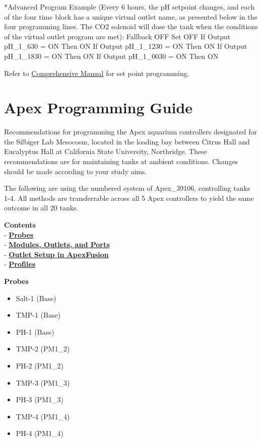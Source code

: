 \documentclass[]{book}
\providecommand{\tightlist}{%
  \setlength{\itemsep}{0pt}\setlength{\parskip}{0pt}}
\begin{document}
*Advanced Program Example (Every 6 hours, the pH setpoint changes, and
each of the four time block has a unique virtual outlet name, as
presented below in the four programming lines. The CO2 solenoid will
dose the tank when the conditions of the virtual outlet program are
met): Fallback OFF Set OFF If Output pH\_1\_630 = ON Then ON If Output
pH\_1\_1230 = ON Then ON If Output pH\_1\_1830 = ON Then ON If Output
pH\_1\_0030 = ON Then ON

Refer to
\href{https://github.com/SilbigerLab/Mesocosm_User_Manual/tree/7503b88686aef920c4a4ed473b1efe37b34dae10/Manuals/Apex_Comprehensive_Reference_Manual.pdf}{Comprehensive
Manual} for set point programming.

\chapter{Apex Programming Guide}\label{apex-programming-guide}

Recommendations for programming the Apex aquarium controllers designated
for the Silbiger Lab Mesocosm, located in the loading bay between Citrus
Hall and Eucalyptus Hall at California State University, Northridge.
These recommendations are for maintaining tanks at ambient conditions.
Changes should be made according to your study aims.

The following are using the numbered system of Apex\_39106, controlling
tanks 1-4. All methods are transferrable across all 5 Apex controllers
to yield the same outcome in all 20 tanks.

\textbf{Contents}\\
- \protect\hyperlink{Probes}{\textbf{Probes}}\\
- \protect\hyperlink{Modules_Outlets_and_Ports}{\textbf{Modules,
Outlets, and Ports}}\\
- \protect\hyperlink{Outlet_Setup}{\textbf{Outlet Setup in
ApexFusion}}\\
- \protect\hyperlink{Profiles}{\textbf{Profiles}}

 \textbf{Probes}

\begin{itemize}
\tightlist
\item
  Salt-1 (Base)
\item
  TMP-1 (Base)
\item
  PH-1 (Base)
\item
  TMP-2 (PM1\_2)
\item
  PH-2 (PM1\_2)
\item
  TMP-3 (PM1\_3)
\item
  PH-3 (PM1\_3)
\item
  TMP-4 (PM1\_4)
\item
  PH-4 (PM1\_4)
\end{itemize}
\end{document}
